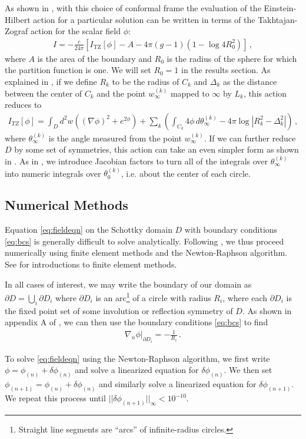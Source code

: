 \documentclass[letterpaper,12pt]{article}
\newcommand{\ban}[1]{\begin{align}#1\end{align}}
\begin{document}
As shown in \cite{Krasnov1}, with this choice of conformal frame the evaluation of the Einstein-Hilbert action for a particular solution can be written in terms of the Takhtajan-Zograf action \cite{TZ} for the scalar field $\phi$:
\ban{
I = - \frac c{24\pi} \left[ I_\text{TZ}[\phi] - A - 4 \pi (g-1)(1-\log 4 R_0^2)\right]\, ,
}
where $A$ is the area of the boundary and $R_0$ is the radius of the sphere for which the partition function is one. We will set $R_0=1$ in the results section. As explained in \cite{MRW}, if we define $R_k$ to be the radius of $C_k$ and $\Delta_k$ as the distance between the center of $C_k$ and the point $w_\infty^{(k)}$ mapped to $\infty$ by $L_k$, this action reduces to
\ban{
I_{TZ}[\phi] = \int_D d^2 w\left( \left(\nabla \phi\right)^2 + e^{2\phi} \right) + \sum_k \left(\int_{C_k} 4 \phi\, d\theta_\infty^{(k)}  - 4 \pi \log \left |R_k^2 - \Delta_k^2 \right|\right)\,,
}
where $\theta_\infty^{(k)}$ is the angle measured from the point $w_{\infty}^{(k)}$.  If we can further reduce $D$ by some set of symmetries, this action can take an even simpler form as shown in \cite{MRW,cones}. As in \cite{cones}, we introduce Jacobian factors to turn all of the integrals over $\theta^{(k)}_\infty$ into numeric integrals over $\theta^{(k)}_0$, i.e. about the center of each circle.

\subsection{Numerical Methods}
\label{sec:methods}
Equation \eqref{eq:fieldeqn} on the Schottky domain $D$ with boundary conditions \eqref{eq:bcs} is generally difficult to solve analytically. Following \cite{MRW}, we thus proceed numerically using finite element methods and the Newton-Raphson algorithm. See \cite{FEMgentle,FEMlecture} for introductions to finite element methods.

In all cases of interest, we may write the boundary of our domain as $\partial D = \bigcup_i \partial D_i$ where $\partial D_i$ is an arc\footnote{Straight line segments are ``arcs'' of infinite-radius circles.} of a circle with radius $R_i$, where each $\partial D_i$ is the fixed point set of some involution or reflection symmetry of $D$. As shown in appendix A of \cite{MRW}, we can then use the boundary conditions \eqref{eq:bcs} to find
\ban{
\left.\nabla_n \phi \right|_{\partial D_i } = - \frac 1 {R_i} \, \label{eq:bcred}.
}

To solve \eqref{eq:fieldeqn} using the Newton-Raphson algorithm, we first write $\phi = \phi_{(n)} + \delta \phi_{(n)}$ and solve a linearized equation for $\delta\phi_{(n)}$. We then set $\phi_{(n+1)} = \phi_{(n)}+ \delta\phi_{(n)}$ and similarly solve a linearized equation for $\delta\phi_{(n+1)}$. We repeat this process until $||\delta\phi_{(n+1)}||_\infty < 10^{-10}$.
\end{document}
